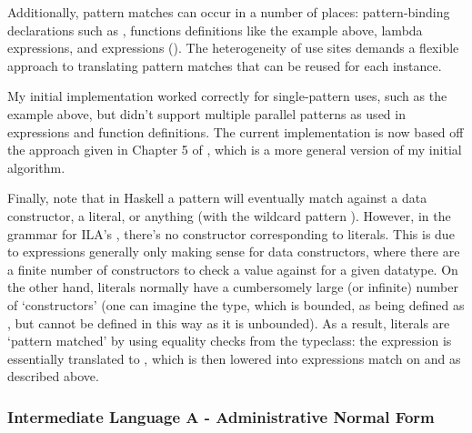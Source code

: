 \documentclass[dissertation.tex]{subfiles}
\begin{document}
{{{            Additionally, pattern matches can occur in a number of places: pattern-binding declarations such as
            , functions definitions like the example above, lambda expressions, and
             expressions (). The heterogeneity
            of use sites demands a flexible approach to translating pattern matches that can be reused for each
            instance.

            My initial implementation worked correctly for single-pattern uses, such as the  example above,
            but didn't support multiple parallel patterns as used in  expressions and function
            definitions. The current implementation is now based off the approach given in Chapter 5 of
            \cite{ImplFunLang}, which is a more general version of my initial algorithm.


            Finally, note that in Haskell a pattern will eventually match against a data constructor, a literal, or
            anything (with the wildcard pattern \haskell{_}). However, in the grammar for ILA's
            , there's no constructor corresponding to literals. This is due to 
            expressions generally only making sense for data constructors, where there are a finite number of
            constructors to check a value against for a given datatype. On the other hand, literals normally have a
            cumbersomely large (or infinite) number of `constructors' (one can imagine the  type, which is
            bounded, as being defined as , but  cannot be
            defined in this way as it is unbounded). As a result, literals are `pattern matched' by using equality
            checks from the  typeclass: the expression  is
            essentially translated to , which is then lowered
            into  expressions match on  and  as described above.

        }
        \subsubsection{Intermediate Language A - Administrative Normal Form}
        {

}}}
\end{document}
